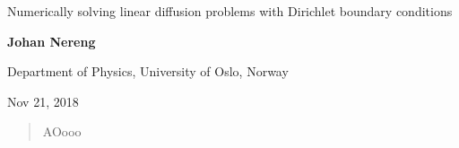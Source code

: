 \documentclass[%
oneside,                 %
final,                   %
10pt]{article}
\begin{document}

\newcommand{\exercisesection}[1]{\subsection*{#1}}






\thispagestyle{empty}

\begin{center}
{\LARGE\bf
\begin{spacing}{1.25}
Numerically solving linear diffusion problems with Dirichlet boundary conditions
\end{spacing}
}
\end{center}


\begin{center}
{\bf Johan Nereng}
\end{center}

    \begin{center}
\centerline{{\small Department of Physics, University of Oslo, Norway}}
\end{center}
    

\begin{center}
Nov 21, 2018
\end{center}

\vspace{1cm}
\begin{abstract}
AOooo
\end{abstract}
\end{document}
